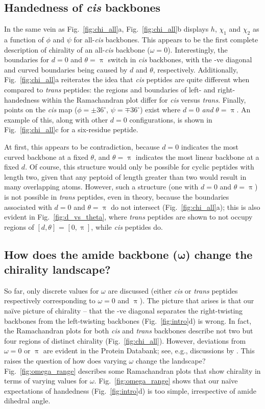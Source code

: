 \documentclass[fleqn,10pt,lineno]{wlpeerj} %
\newcommand{\n}[1]{{\color{blue}#1}}
\newcommand{\Fig}[1]{Fig.~\ref{#1}}
\newcommand{\h}{h}
\newcommand{\cis}{{\em cis}\xspace}
\newcommand{\trans}{{\em trans}\xspace}
\begin{document}
\subsection*{Handedness \n{of} \textit{cis} backbones}
In the same vein as \Fig{fig:chi_all}a, \Fig{fig:chi_all}b displays $\h$, $\chi_1$ and $\chi_2$ as a function of $\phi$ and $\psi$ for all-\cis backbones. This appears to be the first complete description of chirality of an all-\cis backbone ($\omega=0$). Interestingly, the boundaries for $d=0$ and $\theta=\uppi$ switch in \cis backbones, with the -ve diagonal and curved boundaries being caused by $d$ and $\theta$, respectively. Additionally, \Fig{fig:chi_all}a reiterates the idea that \cis peptides are quite different when compared to \trans peptides: the regions and boundaries of left- and right-handedness within the Ramachandran plot differ for \cis versus \trans. Finally, points on the \cis map ($\phi=\pm36^\circ$, $\psi=\mp36^\circ$) exist where $d=0$ {\em and} $\theta=\uppi$. \n{An example of this, along with other $d=0$ configurations, is shown in \Fig{fig:chi_all}c for a six-residue peptide.}

At first, this appears to be contradiction, because $d=0$ indicates the most curved backbone at a fixed $\theta$, and $\theta=\uppi$ indicates the most linear backbone at a fixed $d$. \n{Of course, this structure would only be possible for cyclic peptides with length two, given that any peptoid of length greater than two would result in many overlapping atoms}. However, such a structure (one with $d=0$ and $\theta=\uppi$) is not possible in \trans peptides, even in theory, because the boundaries associated with $d=0$ and $\theta=\uppi$ \n{do not} intersect (\Fig{fig:chi_all}a); this is also evident in \Fig{fig:d_vs_theta}, where \trans peptides are shown to not occupy regions of $[d,\theta]$ = $[0,\uppi]$, while \cis peptides do.

\subsection*{\n{How does the amide backbone ($\bm\omega$) change the chirality landscape?}}
\n{So far, only discrete values for $\omega$ are discussed (either \cis or \trans peptides respectively corresponding to $\omega=0$ and $\uppi$).  The picture that arises is that our na{\"i}ve picture of chirality -- that the -ve diagonal separates the right-twisting backbones from the left-twisting backbones (\Fig{fig:intro}d) is wrong. In fact, the Ramachandran plots for both \cis and \trans backbones describe not two but four regions of distinct chirality (\Fig{fig:chi_all}). However, deviations from $\omega = 0$ or $\uppi$ are evident in the Protein Databank; see, e.g., discussions by \cite{Improta2011}. This raises the question of how does varying $\omega$ change the landscape? \Fig{fig:omega_range} describes some Ramachandran plots that show chirality in terms of varying values for $\omega$. \Fig{fig:omega_range} shows that our na{\"i}ve expectations of handedness (\Fig{fig:intro}d) is too simple, irrespective of amide dihedral angle.}
\end{document}
